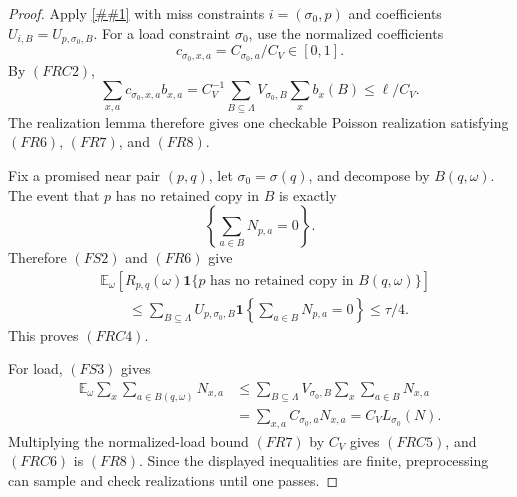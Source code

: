 \documentclass[10pt]{article}
\newcommand{\cref}[1]{\ref{##1}}
\theoremstyle{definition}
\newcommand{\E}{\mathbb{E}}
\begin{document}
\begin{proof}
   Apply \cref{lem:finite-poisson-rate-coverage-realization} with miss
   constraints \(i=(\sigma_0,p)\) and coefficients
   \(U_{i,B}=U_{p,\sigma_0,B}\).  For a load constraint \(\sigma_0\), use the
   normalized coefficients
   \[
      c_{\sigma_0,x,a}=C_{\sigma_0,a}/C_V\in[0,1].
   \]
   By \((FRC2)\),
   \[
      \sum_{x,a}c_{\sigma_0,x,a}b_{x,a}
      =
      C_V^{-1}
      \sum_{B\subseteq\Lambda}
      V_{\sigma_0,B}\sum_xb_x(B)
      \le \ell/C_V .
   \]
   The realization lemma therefore gives one checkable Poisson realization
   satisfying \((FR6)\), \((FR7)\), and \((FR8)\).

   Fix a promised near pair \((p,q)\), let \(\sigma_0=\sigma(q)\), and
   decompose by \(B(q,\omega)\).  The event that \(p\) has no retained copy in
   \(B\) is exactly
   \[
      \left\{\sum_{a\in B}N_{p,a}=0\right\}.
   \]
   Therefore \((FS2)\) and \((FR6)\) give
   \[
   \begin{aligned}
      &\E_\omega\!\left[
         R_{p,q}(\omega)
         \mathbf 1\{p\text{ has no retained copy in }B(q,\omega)\}
      \right] \\
      &\qquad\le
      \sum_{B\subseteq\Lambda}
      U_{p,\sigma_0,B}
      \mathbf 1\!\left\{\sum_{a\in B}N_{p,a}=0\right\}
      \le\tau/4 .
   \end{aligned}
   \]
   This proves \((FRC4)\).

   For load, \((FS3)\) gives
   \[
   \begin{aligned}
      \E_\omega
      \sum_{x}\sum_{a\in B(q,\omega)}N_{x,a}
      &\le
      \sum_{B\subseteq\Lambda}
      V_{\sigma_0,B}\sum_x\sum_{a\in B}N_{x,a}\\
      &=
      \sum_{x,a}C_{\sigma_0,a}N_{x,a}
      =
      C_V L_{\sigma_0}(N).
   \end{aligned}
   \]
   Multiplying the normalized-load bound \((FR7)\) by \(C_V\) gives
   \((FRC5)\), and \((FRC6)\) is \((FR8)\).  Since the displayed inequalities
   are finite, preprocessing can sample and check realizations until one passes.
\end{proof}
\end{document}
